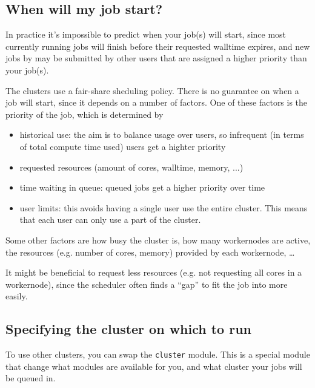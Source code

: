 \ifgent
\subsection{When will my job start?}
\label{subsec:priority}
In practice it's impossible to predict when your job(s) will start,
since most currently running jobs will finish before their requested walltime
expires, and new jobs by may be submitted by other users that are assigned a higher
priority than your job(s).

The \hpcInfra clusters use a fair-share sheduling policy. There is no guarantee on when a
job will start, since it depends on a number of factors. One of these factors is
the priority of the job, which is determined by
\begin{itemize}
    \item historical use: the aim is to balance usage over users, so
        infrequent (in terms of total compute time used) users get a highter priority

    \item requested resources (amount of cores, walltime, memory, ...)

    \item time waiting in queue: queued jobs get a higher priority over time

    \item user limits: this avoids having a single user use the entire cluster.
        This means that each user can only use a part of the cluster.

\end{itemize}
Some other factors are how busy the cluster is, how many workernodes are active,
the resources (e.g. number of cores, memory) provided by each workernode, \ldots

It might be beneficial to request less resources (e.g. not requesting all cores
in a workernode), since the scheduler often finds a ``gap'' to fit the job into
more easily.

\fi

\ifgent

\subsection{Specifying the cluster on which to run}
\label{subsec:specifying-the-cluster-on-which-to-run}

To use other clusters, you can swap the \verb|cluster| module.
This is a special module that change what modules are available for you,
and what cluster your jobs will be queued in.

